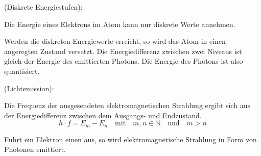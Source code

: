 \documentclass{tuftebook}
\begin{document}
    \begin{postulat}
        \vspace{-1em}
        (Diskrete Energiestufen):
        \vspace{\baselineskip}
        
        \noindent Die Energie eines Elektrons im Atom kann nur diskrete Werte  annehmen.
    \end{postulat}
    Werden die diskreten Energiewerte erreicht, so wird das Atom in einen angeregten Zustand versetzt. Die Energiedifferenz zwischen zwei Niveaus ist gleich der Energie des emittierten Photons. Die Energie des Photons ist also quantisiert.

    \begin{postulat}
        \vspace{-1em}
        (Lichtemission):
        \vspace{\baselineskip}

        \noindent Die Frequenz der ausgesendeten elektromagnetischen Strahlung ergibt sich aus der Energiedifferenz zwischen dem Ausgangs- und Endzustand.
        \begin{equation}
            h\cdot f=E_m-E_n\quad\text{mit}\quad m,n\in\mathbb{N}\quad\text{und}\quad m>n
        \label{eq:lichtemission}
        \end{equation}
    \end{postulat}
    Führt ein Elektron einen  aus, so wird elektromagnetische Strahlung in Form von Photonen emittiert.
\end{document}
